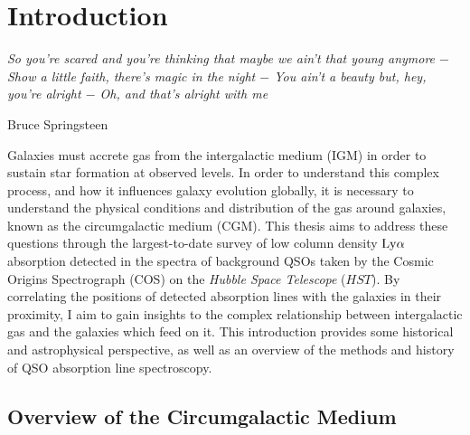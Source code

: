 \chapter[Introduction]{Introduction}
\label{chap:intro}

\vspace*{\fill}

\epigraph{\fixspacing\emph{So you're scared and you're thinking that maybe we ain't that young anymore $-$
Show a little faith, there's magic in the night $-$
You ain't a beauty but, hey, you're alright $-$
Oh, and that's alright with me}}{Bruce Springsteen}



\graphicspath{{Introduction/figures/}}

\clearpage


Galaxies must accrete gas from the intergalactic medium (IGM) in order to sustain star formation at observed levels. In order to understand this complex process, and how it influences galaxy evolution globally, it is necessary to understand the physical conditions and distribution of the gas around galaxies, known as the circumgalactic medium (CGM). This thesis aims to address these questions through the largest-to-date survey of low column density $\rm Ly\alpha$ absorption detected in the spectra of background QSOs taken by the Cosmic Origins Spectrograph (COS) on the \emph{Hubble Space Telescope} ($HST$). By correlating the positions of detected absorption lines with the galaxies in their proximity, I aim to gain insights to the complex relationship between intergalactic gas and the galaxies which feed on it. This introduction provides some historical and astrophysical perspective, as well as an overview of the methods and history of QSO absorption line spectroscopy.


\section{Overview of the Circumgalactic Medium}


